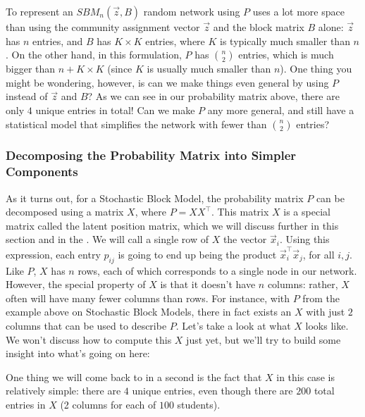 \documentclass[letterpaper,10pt,english]{jupyterBook}
\begin{document}
\sphinxAtStartPar
To represent an \(SBM_n(\vec z, B)\) random network using \(P\) uses a lot more space than using the community assignment vector \(\vec z\) and the block matrix \(B\) alone: \(\vec z\) has \(n\) entries, and \(B\) has \(K \times K\) entries, where \(K\) is typically much smaller than \(n\). On the other hand, in this formulation, \(P\) has \(\binom{n}{2}\) entries, which is much bigger than \(n + K \times K\) (since \(K\) is usually much smaller than \(n\)). One thing you might be wondering, however, is can we make things even  general by using \(P\) instead of \(\vec z\) and \(B\)? As we can see in our probability matrix above, there are only \(4\) unique entries in total! Can we make \(P\) any more general, and still have a statistical model that simplifies the network with fewer than \(\binom{n}{2}\) entries?


\subsubsection{Decomposing the Probability Matrix into Simpler Components}
\label{\detokenize{representations/ch5/single-network-models_RDPG:decomposing-the-probability-matrix-into-simpler-components}}
\sphinxAtStartPar
As it turns out, for a Stochastic Block Model, the probability matrix \(P\) can be decomposed using a matrix \(X\), where \(P = X X^\top\). This matrix \(X\) is a special matrix called the latent position matrix, which we will discuss further in this section and in the . We will call a single row of \(X\) the vector \(\vec x_i\). Using this expression, each entry \(p_{ij}\) is going to end up being the product \(\vec x_i^\top \vec x_j\), for all \(i, j\). Like \(P\), \(X\) has \(n\) rows, each of which corresponds to a single node in our network. However, the special property of \(X\) is that it doesn’t  have \(n\) columns: rather, \(X\) often will have many fewer columns than rows. For instance, with \(P\) from the example above on Stochastic Block Models, there in fact exists an \(X\) with just \(2\) columns that can be used to describe \(P\). Let’s take a look at what \(X\) looks like. We won’t discuss how to compute this \(X\) just yet, but we’ll try to build some insight into what’s going on here:

\noindent{}

\sphinxAtStartPar
One thing we will come back to in a second is the fact that \(X\) in this case is relatively simple: there are  \(4\) unique entries, even though there are \(200\) total entries in \(X\) (2 columns for each of \(100\) students).
\end{document}
